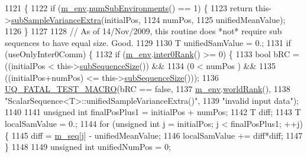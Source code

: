 \begin{DoxyCode}
1121 \{
1122   \textcolor{keywordflow}{if} (\hyperlink{class_q_u_e_s_o_1_1_scalar_sequence_a71618cd6351b29361b437af68447a4c8}{m\_env}.\hyperlink{class_q_u_e_s_o_1_1_base_environment_ac0345f57e31ef7833e379ed972bd094d}{numSubEnvironments}() == 1) \{
1123     \textcolor{keywordflow}{return} this->\hyperlink{class_q_u_e_s_o_1_1_scalar_sequence_a96aa7ad157eb648ffd65f99008609200}{subSampleVarianceExtra}(initialPos,
1124                                         numPos,
1125                                         unifiedMeanValue);
1126   \}
1127 
1128   \textcolor{comment}{// As of 14/Nov/2009, this routine does *not* require sub sequences to have equal size. Good.}
1129 
1130   T unifiedSamValue = 0.;
1131   \textcolor{keywordflow}{if} (useOnlyInter0Comm) \{
1132     \textcolor{keywordflow}{if} (\hyperlink{class_q_u_e_s_o_1_1_scalar_sequence_a71618cd6351b29361b437af68447a4c8}{m\_env}.\hyperlink{class_q_u_e_s_o_1_1_base_environment_ae106b5bb8a80b655b88b3a26b1e7c185}{inter0Rank}() >= 0) \{
1133       \textcolor{keywordtype}{bool} bRC = ((initialPos          <  this->\hyperlink{class_q_u_e_s_o_1_1_scalar_sequence_a0288ea295eedc216a1617b3286f6f3a0}{subSequenceSize}()) &&
1134                   (0                   <  numPos                 ) &&
1135                   ((initialPos+numPos) <= this->\hyperlink{class_q_u_e_s_o_1_1_scalar_sequence_a0288ea295eedc216a1617b3286f6f3a0}{subSequenceSize}()));
1136       \hyperlink{_defines_8h_a56d63d18d0a6d45757de47fcc06f574d}{UQ\_FATAL\_TEST\_MACRO}(bRC == \textcolor{keyword}{false},
1137                           \hyperlink{class_q_u_e_s_o_1_1_scalar_sequence_a71618cd6351b29361b437af68447a4c8}{m\_env}.\hyperlink{class_q_u_e_s_o_1_1_base_environment_a78b57112bbd0e6dd0e8afec00b40ffa7}{worldRank}(),
1138                           \textcolor{stringliteral}{"ScalarSequence<T>::unifiedSampleVarianceExtra()"},
1139                           \textcolor{stringliteral}{"invalid input data"});
1140 
1141       \textcolor{keywordtype}{unsigned} \textcolor{keywordtype}{int} finalPosPlus1 = initialPos + numPos;
1142       T diff;
1143       T localSamValue = 0.;
1144       \textcolor{keywordflow}{for} (\textcolor{keywordtype}{unsigned} \textcolor{keywordtype}{int} j = initialPos; j < finalPosPlus1; ++j) \{
1145         diff = \hyperlink{class_q_u_e_s_o_1_1_scalar_sequence_ae616036fd2e62fb69df167814545e893}{m\_seq}[j] - unifiedMeanValue;
1146         localSamValue += diff*diff;
1147       \}
1148 
1149       \textcolor{keywordtype}{unsigned} \textcolor{keywordtype}{int} unifiedNumPos = 0;

\end{DoxyCode}

